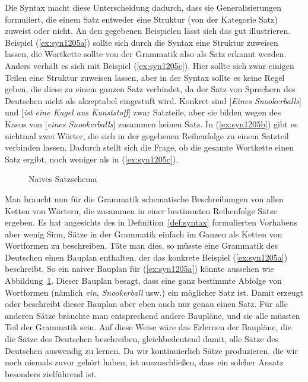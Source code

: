 Die Syntax macht diese Unterscheidung dadurch, dass sie Generalisierungen formuliert, die einem Satz entweder eine Struktur (von der Kategorie Satz) zuweist oder nicht.
An den gegebenen Beispielen lässt sich das gut illustrieren.
Beispiel (\ref{ex:syn1205a}) sollte sich durch die Syntax eine Struktur zuweisen lassen, die Wortkette sollte von der Grammatik also als Satz erkannt werden.
Anders verhält es sich mit Beispiel (\ref{ex:syn1205c}).
Hier sollte sich zwar einigen Teilen eine Struktur zuweisen lassen, aber in der Syntax sollte es keine Regel geben, die diese zu einem ganzen Satz verbindet, da der Satz von Sprechern des Deutschen \idR nicht als akzeptabel eingestuft wird.
Konkret sind [\textit{Eines Snookerballs}] und [\textit{ist eine Kugel aus Kunststoff}] zwar Satzteile, aber sie bilden wegen des Kasus von [\textit{eines Snookerballs}] zusammen keinen Satz.
In (\ref{ex:syn1205b}) gibt es nichtmal zwei Wörter, die sich in der gegebenen Reihenfolge zu einem Satzteil verbinden lassen.
Dadurch stellt sich die Frage, ob die gesamte Wortkette einen Satz ergibt, noch weniger als in (\ref{ex:syn1205c}).

\begin{figure}[!htbp]
  \centering
  \caption{Naives Satzschema}
  \label{fig:satzschema1}
\end{figure}

Man braucht nun für die Grammatik schematische Beschreibungen von allen Ketten von Wörtern, die zusammen in einer bestimmten Reihenfolge Sätze ergeben.
Es hat angesichts des in Definition~\ref{def:syntax} formulierten Vorhabens aber wenig Sinn, Sätze in der Grammatik einfach im Ganzen als Ketten von Wortformen zu beschreiben.
Täte man dies, so müsste eine Grammatik des Deutschen einen Bauplan enthalten, der das konkrete Beispiel (\ref{ex:syn1205a}) beschreibt.
So ein naiver Bauplan für (\ref{ex:syn1205a}) könnte aussehen wie Abbildung~\ref{fig:satzschema1}.
Dieser Bauplan besagt, dass eine ganz bestimmte Abfolge von Wortformen (nämlich \textit{ein}, \textit{Snookerball} usw.) ein möglicher Satz ist.
Damit erzeugt oder beschreibt dieser Bauplan aber eben auch nur genau einen Satz.
Für alle anderen Sätze bräuchte man entsprechend andere Baupläne, und sie alle müssten Teil der Grammatik sein.
Auf diese Weise wäre das Erlernen der Baupläne, die die Sätze des Deutschen beschreiben, gleichbedeutend damit, alle Sätze des Deutschen auswendig zu lernen.
Da wir kontinuierlich Sätze produzieren, die wir noch niemals zuvor gehört haben, ist auszuschließen, dass ein solcher Ansatz besonders zielführend ist.

